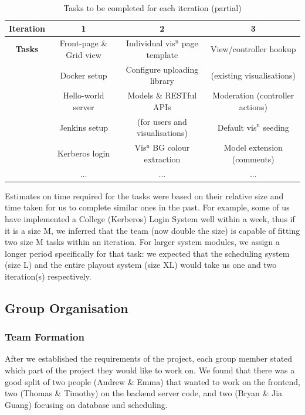 \documentclass[a4paper, titlepage]{article}
\begin{document}
\begin{table}[h!]
  \begin{tabular}{c | c | c | c }
    \textbf{Iteration} & 1 & 2 & 3 \\ \hline
   \textbf{Tasks} & Front-page \& Grid view & Individual vis$^\textrm{n}$ page template & View/controller hookup\\
      & Docker setup & Configure uploading library & (existing visualisations)\\
      & Hello-world server & Models \& RESTful APIs& Moderation (controller actions)\\
      & Jenkins setup & (for users and visualisations)& Default vis$^\textrm{n}$ seeding\\
      & Kerberos login& Vis$^\textrm{n}$ BG colour extraction & Model extension (comments)\\
      & ... & ... & ...
  \end{tabular}
  \caption{Tasks to be completed for each iteration (partial)}
  \label{tab:projman_iplan}
\end{table}


Estimates on time required for the tasks were based on their relative size and
time taken for us to complete similar ones in the past. For example, some of us
have implemented a College (Kerberos) Login System well within a week, thus if
it is a size M, we inferred that the team (now double the size) is capable of 
fitting two size M tasks within an iteration. For larger system modules, we
assign a longer period specifically for that task: we expected that the scheduling
system (size L) and the entire playout system (size XL) would take us one and
two iteration(s) respectively.


\subsection{Group Organisation} \label{sec:projman_group}

\subsubsection{Team Formation}
After we established the requirements of the project, each group member stated
which part of the project they would like to work on. We found that there was a
good split of two people (Andrew \& Emma) that wanted to work on the frontend,
two (Thomas \& Timothy) on the backend server code, and two (Bryan \& Jia Guang)
focusing on database and scheduling.
\end{document}
